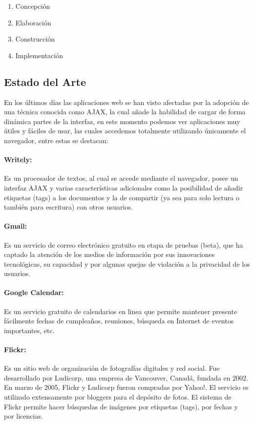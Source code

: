 \begin{enumerate}

	\item Concepción
	\item Elaboración
	\item Construcción
	\item Implementación

\end{enumerate}


\subsection{Estado del Arte}

En los últimos días las aplicaciones web se han visto afectadas por la adopción de una técnica conocida como AJAX, la cual añade la habilidad de cargar de forma dinámica partes de la interfaz, en este momento podemos ver aplicaciones muy útiles y fáciles de usar, las cuales accedemos totalmente utilizando únicamente el navegador, entre estas se destacan:


\paragraph{Writely: \cite{writely}} Es un procesador de textos, al cual se accede mediante el navegador, posee un interfaz AJAX y varias características adicionales como la posibilidad de añadir etiquetas (tags) a los documentos y la de compartir (ya sea para solo lectura o también para escritura) con otros usuarios.

\paragraph{Gmail: \cite{gmail}} Es un servicio de correo electrónico gratuito en etapa de pruebas (beta), que ha captado la atención de los medios de información por sus innovaciones tecnológicas, su capacidad y por algunas quejas de violación a la privacidad de los usuarios.

\paragraph{Google Calendar: \cite{google_calendar}} Es un servicio gratuito de calendarios en linea que permite mantener presente fácilmente fechas de cumpleaños, reuniones, búsqueda en Internet de eventos importantes, etc.

\paragraph{Flickr: \cite{flickr}} Es un sitio web de organización de fotografías digitales y red social. Fue desarrollado por Ludicorp, una empresa de Vancouver, Canadá, fundada en 2002. En marzo de 2005, Flickr y Ludicorp fueron compradas por Yahoo!. El servicio es utilizado extensamente por bloggers para el depósito de fotos. El sistema de Flickr permite hacer búsquedas de imágenes por etiquetas (tags), por fechas y por licencias.


